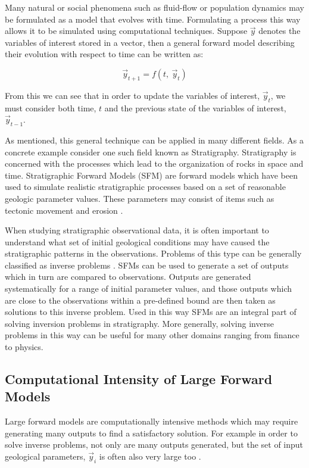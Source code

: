 \documentclass[12pt]{article}
\begin{document}
Many natural or social phenomena such as fluid-flow or population dynamics may be formulated as a model that evolves with time. Formulating a process this way allows it to be simulated using computational techniques. Suppose $\vec y$ denotes the variables of interest stored in a vector, then a general forward model describing their evolution with respect to time can be written as:

\begin{center}
	\begin{equation}
	\vec y_{t+1} = f(t, ~\vec y_t)
	\end{equation}
\end{center}

From this we can see that in order to update the variables of interest, $\vec y_t$, we must consider both time, $t$ and the previous state of the variables of interest, $\vec y_{t-1}$.

As mentioned, this general technique can be applied in many different fields. As a concrete example consider one such field known as Stratigraphy. Stratigraphy is concerned with the processes which lead to the organization of rocks in space and time. Stratigraphic Forward Models (SFM) are forward models which have been used to simulate realistic stratigraphic processes based on a set of reasonable geologic parameter values. These parameters may consist of items such as tectonic movement and erosion \autocite{10.2110/pec.99.62.0069}.

When studying stratigraphic observational data, it is often important to understand what set of initial geological conditions may have caused the stratigraphic patterns in the observations. Problems of this type can be generally classified as inverse problems \autocite{10.1260/0144598011492363}. SFMs can be used to generate a set of outputs which in turn are compared to observations. Outputs are generated systematically for a range of initial parameter values, and those outputs which are close to the observations within a pre-defined bound are then taken as solutions to this inverse problem. Used in this way SFMs are an integral part of solving inversion problems in stratigraphy. More generally, solving inverse problems in this way can be useful for many other domains ranging from finance to physics.

\subsection{Computational Intensity of Large Forward Models}
Large forward models are computationally intensive methods which may require generating many outputs to find a satisfactory solution. For example in order to solve inverse problems, not only are many outputs generated, but the set of input geological parameters, $\vec y_i$ is often also very large too \autocite{10.1260/0144598011492363}.
\end{document}
